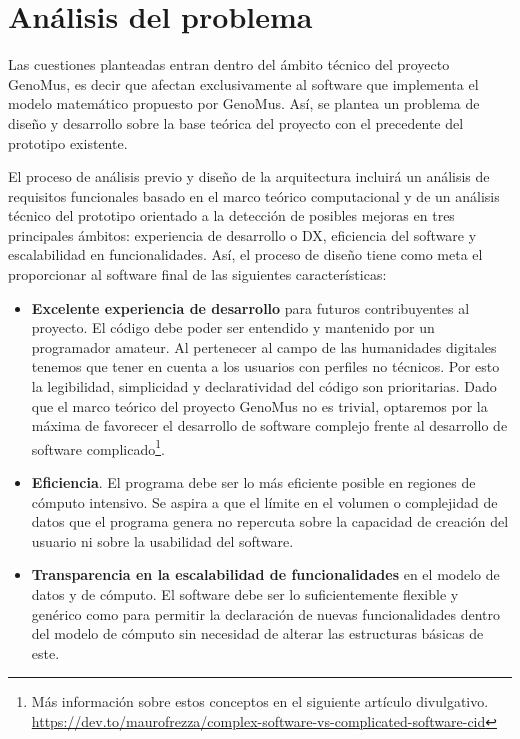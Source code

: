 \chapter{Análisis del problema}

Las cuestiones planteadas entran dentro del ámbito técnico del proyecto GenoMus, es decir que afectan exclusivamente al software que implementa el modelo matemático propuesto por GenoMus. Así, se plantea un problema de diseño y desarrollo sobre la base teórica del proyecto con el precedente del prototipo existente.

El proceso de análisis previo y diseño de la arquitectura incluirá un análisis de requisitos funcionales basado en el marco teórico computacional y de un análisis técnico del prototipo orientado a la detección de posibles mejoras en tres principales ámbitos: experiencia de desarrollo o DX, eficiencia del software y escalabilidad en funcionalidades. Así, el proceso de diseño tiene como meta el proporcionar al software final de las siguientes características:

\begin{itemize}
    \item \textbf{Excelente experiencia de desarrollo} para futuros contribuyentes al proyecto. El código debe poder ser entendido y mantenido por un programador amateur. Al pertenecer al campo de las humanidades digitales tenemos que tener en cuenta a los usuarios con perfiles no técnicos. Por esto la legibilidad, simplicidad y declaratividad del código son prioritarias. Dado que el marco teórico del proyecto GenoMus no es trivial, optaremos por la máxima de favorecer el desarrollo de software complejo frente al desarrollo de software complicado\footnote{Más información sobre estos conceptos en el siguiente artículo divulgativo. \url{https://dev.to/maurofrezza/complex-software-vs-complicated-software-cid}}.
    
    \item \textbf{Eficiencia}. El programa debe ser lo más eficiente posible en regiones de cómputo intensivo. Se aspira a que el límite en el volumen o complejidad de datos que el programa genera no repercuta sobre la capacidad de creación del usuario ni sobre la usabilidad del software.
    
    \item \textbf{Transparencia en la escalabilidad de funcionalidades} en el modelo de datos y de cómputo. El software debe ser lo suficientemente flexible y genérico como para permitir la declaración de nuevas funcionalidades dentro del modelo de cómputo sin necesidad de alterar las estructuras básicas de este.
\end{itemize}

